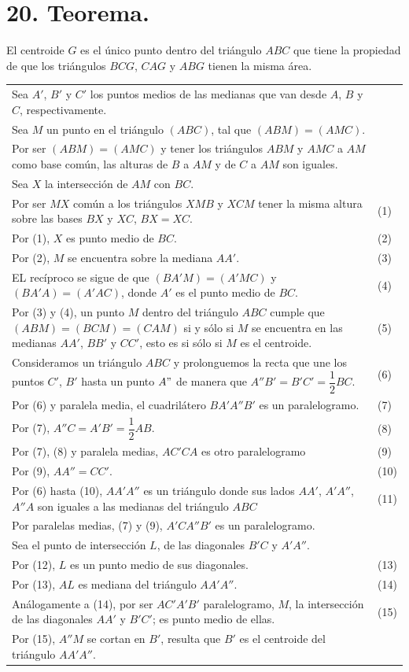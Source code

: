\documentclass[12pt,a4paper, oneside]{book}
\begin{document}
\section{20. Teorema.}
El centroide $G$ es el único punto dentro del triángulo $ABC$ que tiene la propiedad de que los triángulos $BCG$, $CAG$ y $ABG$ tienen la misma área.
\\
\begin{tabular}{p{15.9 cm} p{1cm}}
Sea $A'$, $B'$ y $C'$ los puntos medios de las medianas que van desde $A$, $B$ y $C$, respectivamente. 
\\Sea $M$ un punto en el triángulo $(ABC)$, tal que $(ABM)=(AMC).$
\\Por ser $(ABM)=(AMC)$ y tener los triángulos $ABM$ y $AMC$ a $AM$ como base común, las alturas de $B$ a $AM$ y de $C$ a $AM$ son iguales. 
\\Sea $X$ la intersección de $AM$ con $BC$.
\\Por ser $MX$ común a los triángulos $XMB$ y $XCM$ tener la misma altura sobre las bases $BX$ y $XC$, $BX=XC$. &(1)
\\Por (1), $X$ es punto medio de $BC$. &(2)
\\Por (2), $M$ se encuentra sobre la mediana $AA'$. &(3)
\\EL recíproco se sigue de que $(BA'M)=(A'MC)$ y $(BA'A)=(A'AC)$, donde $A'$ es el punto medio de $BC$.&(4)
\\Por (3) y (4), un punto $M$ dentro del triángulo $ABC$ cumple que $(ABM)=(BCM)=(CAM)$ si y sólo si $M$ se encuentra en las medianas $AA'$, $BB'$ y $CC'$, esto es si sólo si $M$ es el centroide. &\medskip \medskip(5)
\\Consideramos un triángulo $ABC$ y prolonguemos la recta que une los puntos $C'$, $B'$ hasta un punto $A"$ de manera que $A''B'=B'C'=\dfrac{1}{2}BC$.& \medskip (6)
\\Por (6) y paralela media, el cuadrilátero $BA'A''B'$ es un paralelogramo. &(7)
\\Por (7), $A''C=A'B'=\dfrac{1}{2}AB$. &(8)
\\Por (7), (8) y paralela medias, $AC'CA$ es otro paralelogramo &(9)
\\Por (9), $AA''= CC'$. &(10)
\\Por (6) hasta (10), $AA'A''$ es un triángulo donde sus lados $AA'$, $A'A''$, $A''A$ son iguales a las medianas del triángulo $ABC$ &(11)
\\Por paralelas medias, (7) y (9), $A'CA''B'$ es un paralelogramo.
\\Sea el punto de intersección $L$, de las diagonales $B'C$ y $A'A''$.
\\Por (12), $L$ es un punto medio de sus diagonales. &(13)
\\Por (13), $AL$ es mediana del triángulo $AA'A''$. &(14)
\\Análogamente a (14), por ser $AC'A'B'$ paralelogramo, $M$, la intersección de las diagonales $AA'$ y $B'C'$; es punto medio de ellas. &\medskip (15)
\\Por (15), $A''M$ se cortan en $B'$, resulta que $B'$ es el centroide del triángulo $AA'A''$.
\end{tabular} 
\end{document}
